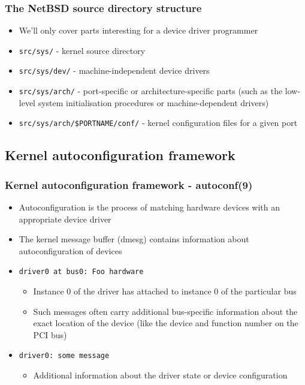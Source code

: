 \documentclass[dvipsnames,table]{beamer}
\begin{document}
\begin{frame}
\frametitle{The NetBSD source directory structure}
\begin{itemize}
	\item We'll only cover parts interesting for a device driver programmer
	\item {\tt src/sys/} - kernel source directory
	\item {\tt src/sys/dev/} - machine-independent device drivers
	\item {\tt src/sys/arch/} - port-specific or architecture-specific parts (such as the low-level system initialisation procedures or machine-dependent drivers)
	\item {\tt src/sys/arch/\$PORTNAME/conf/} - kernel configuration files for a given port

\end{itemize}
\end{frame}

\subsection{Kernel autoconfiguration framework}

\begin{frame}
\frametitle{Kernel autoconfiguration framework - autoconf(9)}
\begin{itemize}
	\item Autoconfiguration is the process of matching hardware devices with an
     appropriate device driver
    \item The kernel message buffer (dmesg) contains information about autoconfiguration of devices
    \item {\tt driver0 at bus0: Foo hardware} 
    \begin{itemize}
    	\item Instance 0 of the driver has attached to instance 0 of the particular bus
		\item Such messages often carry additional bus-specific information about the exact location of the device (like the device and function number on the PCI bus)
	\end{itemize}
    \item {\tt driver0: some message}
    \begin{itemize}
    	\item Additional information about the driver state or device configuration
	\end{itemize}
\end{itemize}
\end{frame}
\end{document}
